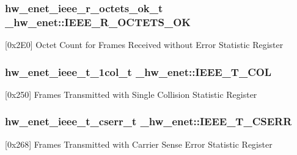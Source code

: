 \subsubsection[{\texorpdfstring{I\+E\+E\+E\+\_\+\+R\+\_\+\+O\+C\+T\+E\+T\+S\+\_\+\+OK}{IEEE_R_OCTETS_OK}}]{ {\bf hw\+\_\+enet\+\_\+ieee\+\_\+r\+\_\+octets\+\_\+ok\+\_\+t} \+\_\+hw\+\_\+enet\+::\+I\+E\+E\+E\+\_\+\+R\+\_\+\+O\+C\+T\+E\+T\+S\+\_\+\+OK}\hypertarget{struct__hw__enet_a660d3468a272beba5daf3eea509da8eb}{}\label{struct__hw__enet_a660d3468a272beba5daf3eea509da8eb}
\mbox{[}0x2\+E0\mbox{]} Octet Count for Frames Received without Error Statistic Register 
\subsubsection[{\texorpdfstring{I\+E\+E\+E\+\_\+\+T\+\_\+1\+C\+OL}{IEEE_T_1COL}}]{ {\bf hw\+\_\+enet\+\_\+ieee\+\_\+t\+\_\+1col\+\_\+t} \+\_\+hw\+\_\+enet\+::\+I\+E\+E\+E\+\_\+\+T\+\_\+C\+OL}\hypertarget{struct__hw__enet_a9a14cd8929a871a034906f2625084181}{}\label{struct__hw__enet_a9a14cd8929a871a034906f2625084181}
\mbox{[}0x250\mbox{]} Frames Transmitted with Single Collision Statistic Register 
\subsubsection[{\texorpdfstring{I\+E\+E\+E\+\_\+\+T\+\_\+\+C\+S\+E\+RR}{IEEE_T_CSERR}}]{ {\bf hw\+\_\+enet\+\_\+ieee\+\_\+t\+\_\+cserr\+\_\+t} \+\_\+hw\+\_\+enet\+::\+I\+E\+E\+E\+\_\+\+T\+\_\+\+C\+S\+E\+RR}\hypertarget{struct__hw__enet_a65b22140bc5c3582f7a6f61c4a3a33ee}{}\label{struct__hw__enet_a65b22140bc5c3582f7a6f61c4a3a33ee}
\mbox{[}0x268\mbox{]} Frames Transmitted with Carrier Sense Error Statistic Register 
